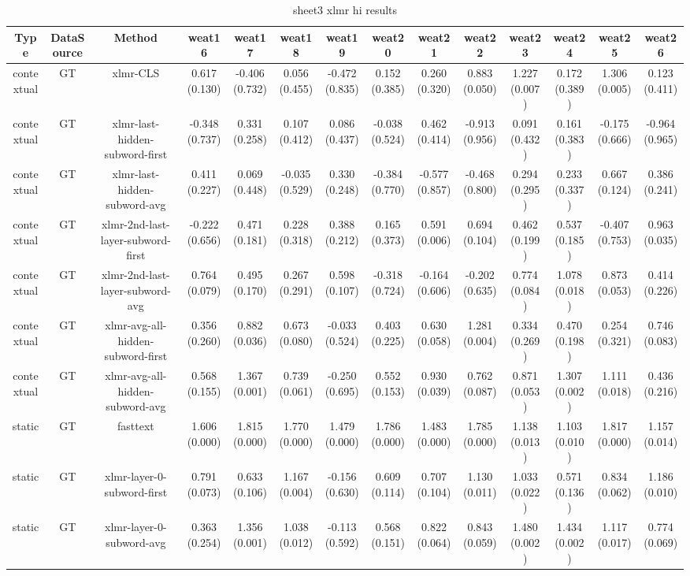 \begin{sidewaystable}[htb]
    \centering
    \caption{sheet3 xlmr hi results}
    \label{appendix_tab:sheet3_xlmr_hi_results}
    \small
    \begin{tabular}{@{}cccccccccccccc@{}}
        \toprule
        Type & DataSource & Method & weat16 & weat17 & weat18 & weat19 & weat20 & weat21 & weat22 & weat23 & weat24 & weat25 & weat26 \\
        \midrule
        contextual & GT & xlmr-CLS & 0.617 (0.130) & -0.406 (0.732) & 0.056 (0.455) & -0.472 (0.835) & 0.152 (0.385) & 0.260 (0.320) & 0.883 (0.050) & 1.227 (0.007) & 0.172 (0.389) & 1.306 (0.005) & 0.123 (0.411) \\
        contextual & GT & xlmr-last-hidden-subword-first & -0.348 (0.737) & 0.331 (0.258) & 0.107 (0.412) & 0.086 (0.437) & -0.038 (0.524) & 0.462 (0.414) & -0.913 (0.956) & 0.091 (0.432) & 0.161 (0.383) & -0.175 (0.666) & -0.964 (0.965) \\
        contextual & GT & xlmr-last-hidden-subword-avg & 0.411 (0.227) & 0.069 (0.448) & -0.035 (0.529) & 0.330 (0.248) & -0.384 (0.770) & -0.577 (0.857) & -0.468 (0.800) & 0.294 (0.295) & 0.233 (0.337) & 0.667 (0.124) & 0.386 (0.241) \\
        contextual & GT & xlmr-2nd-last-layer-subword-first & -0.222 (0.656) & 0.471 (0.181) & 0.228 (0.318) & 0.388 (0.212) & 0.165 (0.373) & 0.591 (0.006) & 0.694 (0.104) & 0.462 (0.199) & 0.537 (0.185) & -0.407 (0.753) & 0.963 (0.035) \\
        contextual & GT & xlmr-2nd-last-layer-subword-avg & 0.764 (0.079) & 0.495 (0.170) & 0.267 (0.291) & 0.598 (0.107) & -0.318 (0.724) & -0.164 (0.606) & -0.202 (0.635) & 0.774 (0.084) & 1.078 (0.018) & 0.873 (0.053) & 0.414 (0.226) \\
        contextual & GT & xlmr-avg-all-hidden-subword-first & 0.356 (0.260) & 0.882 (0.036) & 0.673 (0.080) & -0.033 (0.524) & 0.403 (0.225) & 0.630 (0.058) & 1.281 (0.004) & 0.334 (0.269) & 0.470 (0.198) & 0.254 (0.321) & 0.746 (0.083) \\
        contextual & GT & xlmr-avg-all-hidden-subword-avg & 0.568 (0.155) & 1.367 (0.001) & 0.739 (0.061) & -0.250 (0.695) & 0.552 (0.153) & 0.930 (0.039) & 0.762 (0.087) & 0.871 (0.053) & 1.307 (0.002) & 1.111 (0.018) & 0.436 (0.216) \\
        static & GT & fasttext & 1.606 (0.000) & 1.815 (0.000) & 1.770 (0.000) & 1.479 (0.000) & 1.786 (0.000) & 1.483 (0.000) & 1.785 (0.000) & 1.138 (0.013) & 1.103 (0.010) & 1.817 (0.000) & 1.157 (0.014) \\
        static & GT & xlmr-layer-0-subword-first & 0.791 (0.073) & 0.633 (0.106) & 1.167 (0.004) & -0.156 (0.630) & 0.609 (0.114) & 0.707 (0.104) & 1.130 (0.011) & 1.033 (0.022) & 0.571 (0.136) & 0.834 (0.062) & 1.186 (0.010) \\
        static & GT & xlmr-layer-0-subword-avg & 0.363 (0.254) & 1.356 (0.001) & 1.038 (0.012) & -0.113 (0.592) & 0.568 (0.151) & 0.822 (0.064) & 0.843 (0.059) & 1.480 (0.002) & 1.434 (0.002) & 1.117 (0.017) & 0.774 (0.069) \\
        \bottomrule
    \end{tabular}
\end{sidewaystable}